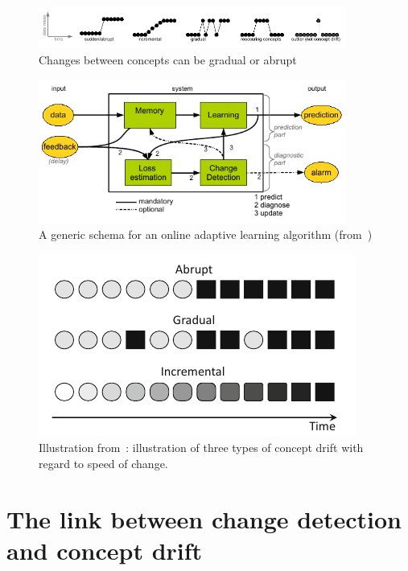\begin{figure}[htb!]
	\centering
	\includegraphics[width=0.9\textwidth]{images_cropped/gama_survey_cd_fig2}
  \caption{Changes between concepts can be gradual or abrupt~\cite{gama2014survey}}\label{fig:fig2_gama_survey_cd}
\end{figure}

\begin{figure}[htb!]
	\centering
	\includegraphics[width=0.9\textwidth]{images_cropped/gama_survey_cd_fig3}
  \caption{A generic schema for an online adaptive learning algorithm (from~\cite{gama2014survey})}\label{fig:fig3_gama_survey_cd}
\end{figure}

\begin{figure}[htb!]
	\centering
	\includegraphics[height=0.15\textheight]{images_cropped/krop_souza_cd_speed}
	\caption{Illustration from~\cite{SouzaChallenges2020}: illustration of three types of concept drift with regard to speed of change.}\label{fig:souza_cd_speeds}
\end{figure}


\section{The link between change detection and concept drift}

